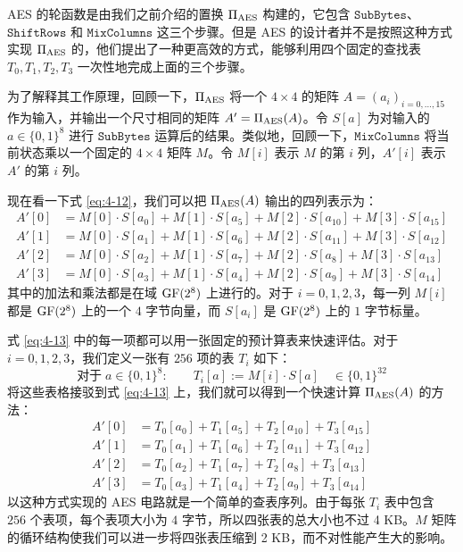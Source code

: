 \begin{snote}
AES 的轮函数是由我们之前介绍的置换 $\Pi_{\rm AES}$ 构建的，它包含 $\mathtt{SubBytes}$、$\mathtt{ShiftRows}$ 和 $\mathtt{MixColumns}$ 这三个步骤。但是 AES 的设计者并不是按照这种方式实现 $\Pi_{\rm AES}$ 的，他们提出了一种更高效的方式，能够利用四个固定的查找表 $T_0,T_1,T_2,T_3$ 一次性地完成上面的三个步骤。

为了解释其工作原理，回顾一下，$\Pi_{\rm AES}$ 将一个 $4\times4$ 的矩阵 $A=(a_i)_{i=0,\dots,15}$ 作为输入，并输出一个尺寸相同的矩阵 $A'=\Pi_{\rm AES}(A)$。令 $S[a]$ 为对输入的 $a\in\{0,1\}^8$ 进行 $\mathtt{SubBytes}$ 运算后的结果。类似地，回顾一下，$\mathtt{MixColumns}$ 将当前状态乘以一个固定的 $4\times4$ 矩阵 $M$。令 $M[i]$ 表示 $M$ 的第 $i$ 列，$A'[i]$ 表示 $A'$ 的第 $i$ 列。

现在看一下式 \ref{eq:4-12}，我们可以把 $\Pi_{\rm AES}(A)$ 输出的四列表示为：
\begin{equation}\label{eq:4-13}
	\begin{aligned}
		A'[0] & = M[0]\cdot S[a_0]+M[1]\cdot S[a_5]+M[2]\cdot S[a_{10}]+M[3]\cdot S[a_{15}]\\ 
		A'[1] & = M[0]\cdot S[a_1]+M[1]\cdot S[a_6]+M[2]\cdot S[a_{11}]+M[3]\cdot S[a_{12}]\\ 
		A'[2] & = M[0]\cdot S[a_2]+M[1]\cdot S[a_7]+M[2]\cdot S[a_8]+M[3]\cdot S[a_{13}] \\ 
		A'[3] & = M[0]\cdot S[a_3]+M[1]\cdot S[a_4]+M[2]\cdot S[a_9]+M[3]\cdot S[a_{14}]
	\end{aligned}
\end{equation}
其中的加法和乘法都是在域 ${\rm GF}(2^8)$ 上进行的。对于 $i=0,1,2,3$，每一列 $M[i]$ 都是 ${\rm GF}(2^8)$ 上的一个 $4$ 字节向量，而 $S[a_i]$ 是 ${\rm GF}(2^8)$ 上的 $1$ 字节标量。

式 \ref{eq:4-13} 中的每一项都可以用一张固定的预计算表来快速评估。对于 $i=0,1,2,3$，我们定义一张有 $256$ 项的表 $T_i$ 如下：
\[
\text{对于}\;a\in\{0,1\}^8:\quad\quad
T_i[a]:=M[i]\cdot S[a]\quad\in\{0,1\}^{32}
\]
将这些表格接驳到式 \ref{eq:4-13} 上，我们就可以得到一个快速计算 $\Pi_{\rm AES}(A)$ 的方法：
\[
\begin{aligned}
A'[0] & = T_0[a_0]+T_1[a_5]+T_2[a_{10}]+T_3[a_{15}]\\
A'[1] & = T_0[a_1]+T_1[a_6]+T_2[a_{11}]+T_3[a_{12}]\\
A'[2] & = T_0[a_2]+T_1[a_7]+T_2[a_8]+T_3[a_{13}]\\
A'[3] & = T_0[a_3]+T_1[a_4]+T_2[a_9]+T_3[a_{14}]
\end{aligned}
\]
以这种方式实现的 AES 电路就是一个简单的查表序列。由于每张 $T_i$ 表中包含 $256$ 个表项，每个表项大小为 $4$ 字节，所以四张表的总大小也不过 4 KB。$M$ 矩阵的循环结构使我们可以进一步将四张表压缩到 2 KB，而不对性能产生大的影响。


\end{snote}

